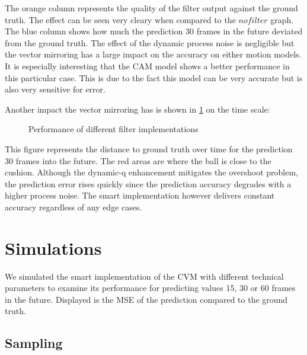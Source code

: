 \documentclass[notitlepage, a4paper, 11pt]{scrartcl}
\begin{document}
\begin{multicols}{2}
The orange column represents the quality of the filter output against the ground truth. 
The effect can be seen very cleary when compared to the $no filter$ graph. 
The blue column shows how much the prediction 30 frames in the future deviated from the ground truth.
The effect of the dynamic process noise is negligible but the vector mirroring has a large impact on the accuracy on either motion models.
It is especially interesting that the CAM model shows a better performance in this particular case. 
This is due to the fact this model can be very accurate but is also very sensitive for error.

Another impact the vector mirroring has is shown in \cref{fig:deviation-noise} on the time scale:

\begin{figure}[H]
    \centering
    \caption{Performance of different filter implementations}
    \label{fig:deviation-noise}
\end{figure}

This figure represents the distance to ground truth over time for the prediction 30 frames into the future. 
The red areas are where the ball is close to the cushion. 
Although the dynamic-q enhancement mitigates the overshoot problem, the prediction error rises quickly since the prediction accuracy degrades with a higher process noise.
The smart implementation however delivers constant accuracy regardless of any edge cases.

\section{Simulations}

We simulated the smart implementation of the CVM with different technical parameters to examine its performance for predicting values 15, 30 or 60 frames in the future.
Displayed is the MSE of the prediction compared to the ground truth.

\subsection{Sampling}


\end{multicols}
\end{document}
